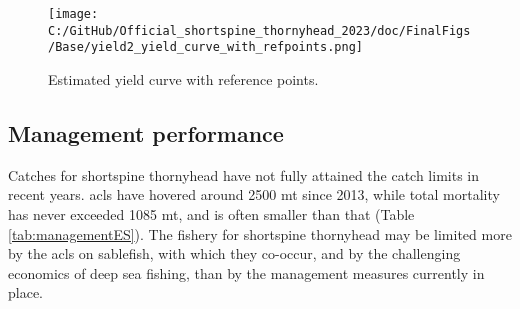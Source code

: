 \documentclass[11pt,
  english,
  letterpaper,
]{article}
\begin{document}
\begin{figure}
\centering
\texttt{[image: C:/GitHub/Official\_shortspine\_thornyhead\_2023/doc/FinalFigs/Base/yield2\_yield\_curve\_with\_refpoints.png]}
\caption{Estimated yield curve with reference points.\label{fig:yieldcurveES}}
\end{figure}

\hypertarget{management-performance}{%
\subsection*{Management performance}\label{management-performance}}

Catches for shortspine thornyhead have not fully attained the catch limits in recent years. \Gls{acl}s have hovered around 2500 mt since 2013, while total mortality has never exceeded 1085 mt, and is often smaller than that (Table \ref{tab:managementES}). The fishery for shortspine thornyhead may be limited more by the \gls{acl}s on sablefish, with which they co-occur, and by the challenging economics of deep sea fishing, than by the management measures currently in place. \begingroup\fontsize{10}{12}\selectfont \begingroup\fontsize{10}{12}\selectfont
\end{document}
